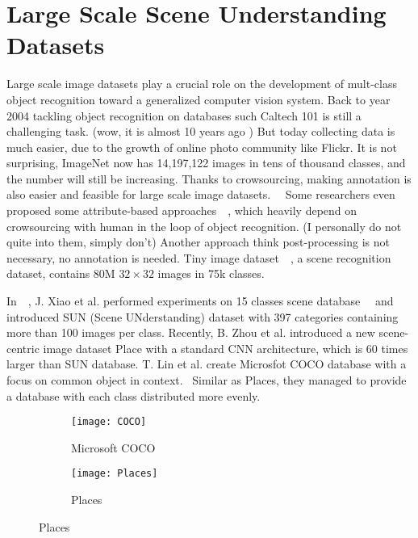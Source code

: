 \documentclass[12pt]{article}
\begin{document}
\section{Large Scale Scene Understanding Datasets}
Large scale image datasets play a crucial role on the development of mult-class object recognition toward a generalized computer vision system. Back to year 2004 tackling object recognition on databases such Caltech 101 is still a challenging task. (wow, it is almost 10 years ago ) But today collecting data is much easier, due to the growth of online photo community like Flickr. It is not surprising, ImageNet now has 14,197,122 images in tens of thousand classes, and the number will still be increasing. Thanks to crowsourcing, making annotation is also easier and feasible for large scale image datasets.~~\citep{WelinderPeronaCVPR2010} Some researchers even proposed some attribute-based approaches~~\citep{parikh2013implied,jayaraman2014zero}, which heavily depend on crowsourcing with human in the loop of object recognition.  (I personally do not quite into them, simply don't) Another approach think post-processing is not necessary, no annotation is needed. Tiny image dataset~~\citep{torralba200880}, a scene recognition dataset, contains 80M $32\times 32$ images in 75k classes.

In~~\citep{xiao2010sun}, J. Xiao et al. performed experiments on 15 classes scene database~~\citep{lazebnik2006beyond} and introduced SUN (Scene UNderstanding) dataset with 397 categories containing more than 100 images per class. Recently, B. Zhou et al. introduced a new scene-centric image dataset Place with a standard CNN architecture, which is 60 times larger than SUN database. T. Lin et al. create Microsfot COCO database with a focus on common object in context.~\citep{MicrosoftCOCO} Similar as Places, they managed to provide a database with each class distributed more evenly.

\begin{figure}
\centering
\begin{subfigure}[hb]{1\textwidth}
\texttt{[image: COCO]}
\caption{Microsoft COCO}
\label{fig:0-0}
\end{subfigure}
\hfill
\begin{subfigure}[hb]{1\textwidth}
\texttt{[image: Places]}
\caption{Places}
\label{fig:0-2}
\end{subfigure}
\label{f1}
\end{figure}
\end{document}

